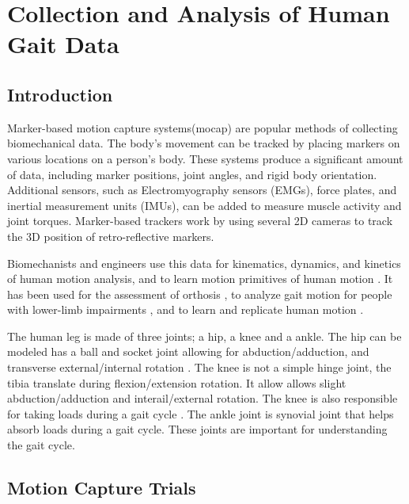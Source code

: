 \chapter{Collection and Analysis of Human Gait Data}
\label{chap:gaitdata}
\section{Introduction}

Marker-based motion capture systems(mocap) are popular methods of collecting biomechanical data. The body's movement can be tracked by placing markers on various locations on a person's body. These systems produce a significant amount of data, including marker positions, joint angles, and rigid body orientation. Additional sensors, such as Electromyography sensors (EMGs), force plates, and inertial measurement units (IMUs), can be added to measure muscle activity and joint torques. Marker-based trackers work by using several 2D cameras to track the 3D position of retro-reflective markers.  

Biomechanists and engineers use this data for kinematics, dynamics, and kinetics of human motion analysis, and to learn motion primitives of human motion \cite{10.7717/peerj.918}. It has been used for the assessment of orthosis \cite{kobetic2009development},  to analyze gait motion for people with lower-limb impairments \cite{lauer2005application} \cite{hicks2011lower}  \cite{cutler2015using} , and to learn and replicate human motion \cite{ott2008motion} \cite{chalodhorn2007learning}. 

The human leg is made of three joints; a hip, a knee and a ankle. The hip can be modeled has a ball and socket joint allowing for abduction/adduction, and transverse external/internal rotation \cite{faptakinesiology}. The knee is not a simple hinge joint, the tibia translate during flexion/extension rotation. It allow allows slight abduction/adduction and interail/external rotation. The knee is also responsible for taking loads during a gait cycle \cite{kuo2007six}. The ankle joint is synovial joint that helps absorb loads during a gait cycle. These joints are important for understanding the gait cycle.


\section{Motion Capture Trials}

